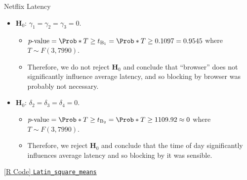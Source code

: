 \begin{Example}{Netflix Latency}{}
\begin{itemize}
\begin{itemize}
              \end{itemize}
        \item $ \mathbf{H}_0 $: $ \gamma_1=\gamma_2=\gamma_3=0 $.
              \begin{itemize}
                  \item $ p\text{-value}=\Prob*{T\ge t_{\text{B}_1}}=\Prob*{T\ge 0.1097}=0.9545 $ where $ T \sim F(3,7990) $.
                  \item Therefore, we do not reject $ \mathbf{H}_0 $ and conclude that ``browser'' does not
                        significantly influence average latency, and so blocking by browser was probably not necessary.
              \end{itemize}
        \item $ \mathbf{H}_0 $: $ \delta_2=\delta_3=\delta_4=0 $.
              \begin{itemize}
                  \item $ p\text{-value}=\Prob*{T\ge t_{\text{B}_2}}=\Prob*{T\ge 1109.92}\approx 0 $ where $ T \sim F(3,7990) $.
                  \item Therefore, we reject $ \mathbf{H}_0 $ and conclude that the time of day significantly influences average latency
                        and so blocking by it was sensible.
              \end{itemize}
    \end{itemize}
    \href{https://github.com/Hextical/university-notes/blob/master/year-3/semester-3/STAT 430/code/W6/Latin_square_means.R}{[R Code] \texttt{Latin\_square\_means}}
\end{Example}
